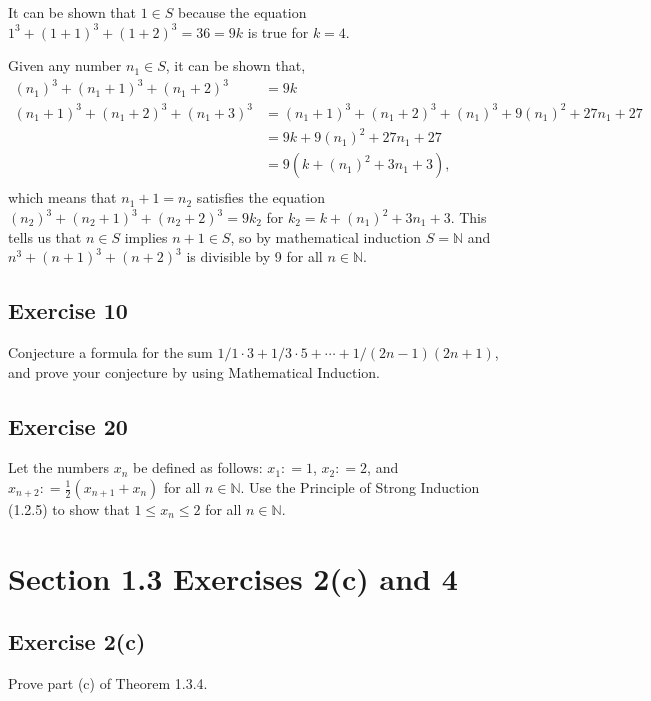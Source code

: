 \documentclass[12pt]{article}
\begin{document}
\begin{flushleft}
It can be shown that $1 \in S$ because the equation $1^3 + \left(1 + 1\right)^3 + \left(1 + 2\right)^3 = 36 = 9k$ is true for $k = 4$.

Given any number $n_1 \in S$, it can be shown that,
\begin{align*}
\left(n_1\right)^3 + \left(n_1 + 1\right)^3 + \left(n_1 + 2\right)^3 &= 9k \\
\left(n_1 + 1\right)^3 + \left(n_1 + 2\right)^3  + \left(n_1 + 3\right)^3 &= \left(n_1 + 1\right)^3 + \left(n_1 + 2\right)^3 + \left(n_1\right)^3 + 9\left(n_1\right)^2 + 27n_1 + 27\\
&= 9k + 9\left(n_1\right)^2 + 27n_1 + 27 \\
&= 9\left(k + \left(n_1\right)^2 + 3n_1 + 3\right)\text{,} \\
\end{align*}
which means that $n_1 + 1 = n_2$ satisfies the equation $\left(n_2\right)^3 + \left(n_2 + 1\right)^3 + \left(n_2 + 2\right)^3 = 9k_2$ for $k_2 = k + \left(n_1\right)^2 + 3n_1 + 3$. This tells us that $n \in S$ implies $n + 1 \in S$, so by mathematical induction $S = \mathbb{N}$ and $n^3 + \left(n + 1\right)^3 + \left(n + 2\right)^3$ is divisible by 9 for all $n \in \mathbb{N}$.

\subsection*{Exercise 10}
Conjecture a formula for the sum $1 / 1 \cdot 3 + 1 / 3 \cdot 5 + \cdots + 1 / \left(2n - 1 \right)\left(2n + 1\right)$, and prove your conjecture by using Mathematical Induction.
\subsection*{Exercise 20}
Let the numbers $x_n$ be defined as follows: $x_1 \mathrel{\mathop:}= 1$, $x_2 \mathrel{\mathop:}= 2$, and $x_{n + 2} \mathrel{\mathop:}= \frac{1}{2}\left(x_{n+1} + x_n\right)$ for all $n \in \mathbb{N}$. Use the Principle of Strong Induction (1.2.5) to show that $1 \leq x_n \leq 2$ for all $n \in \mathbb{N}$.

\section*{Section 1.3 Exercises 2(c) and 4}
\subsection*{Exercise 2(c)}
Prove part (c) of Theorem 1.3.4.

\end{flushleft}
\end{document}
